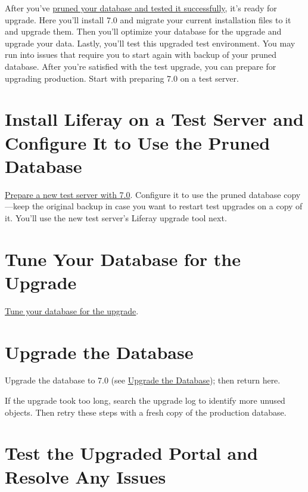 After you've
\href{/docs/7-2/deploy/-/knowledge_base/d/pruning-the-database}{pruned
your database and tested it successfully}, it's ready for upgrade. Here
you'll install 7.0 and migrate your current installation files to it and
upgrade them. Then you'll optimize your database for the upgrade and
upgrade your data. Lastly, you'll test this upgraded test environment.
You may run into issues that require you to start again with backup of
your pruned database. After you're satisfied with the test upgrade, you
can prepare for upgrading production. Start with preparing 7.0 on a test
server.

\section{Install Liferay on a Test Server and Configure It to Use the
Pruned
Database}\label{install-liferay-on-a-test-server-and-configure-it-to-use-the-pruned-database}

\href{/docs/7-2/deploy/-/knowledge_base/d/preparing-a-new-product-server-for-data-upgrade}{Prepare
a new test server with 7.0}. Configure it to use the pruned database
copy---keep the original backup in case you want to restart test
upgrades on a copy of it. You'll use the new test server's Liferay
upgrade tool next.

\section{Tune Your Database for the
Upgrade}\label{tune-your-database-for-the-upgrade}

\href{/docs/7-2/deploy/-/knowledge_base/d/tuning-for-the-data-upgrade}{Tune
your database for the upgrade}.

\section{Upgrade the Database}\label{upgrade-the-database}

Upgrade the database to 7.0 (see
\href{/docs/7-2/deploy/-/knowledge_base/d/upgrading-the-product-data}{Upgrade
the Database}); then return here.

If the upgrade took too long, search the upgrade log to identify more
unused objects. Then retry these steps with a fresh copy of the
production database.

\section{Test the Upgraded Portal and Resolve Any
Issues}\label{test-the-upgraded-portal-and-resolve-any-issues}

